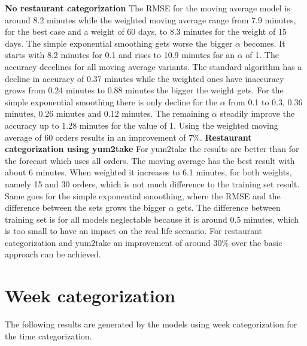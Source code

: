 \newline\newline\textbf{No restaurant categorization}\newline
The RMSE for the moving average model is around 8.2 minutes while the weighted moving average range from 7.9 minutes, for the best case and a weight of 60 days, to 8.3 minutes for the weight of 15 days. The simple exponential smoothing gets worse the bigger $\alpha$ becomes. It starts with 8.2 minutes for 0.1 and rises to 10.9 minutes for an $\alpha$ of 1. The accuracy decelines for all moving average variants. The standard algorithm has a decline in accuracy of 0.37 minutes while the weighted ones have inaccuracy grows from 0.24 minutes to 0.88 minutes the bigger the weight gets. For the simple exponential smoothing there is only decline for the $\alpha$ from 0.1 to 0.3, 0.36 minutes, 0.26 minutes and 0.12 minutes. The remaining $\alpha$ steadily improve the accuracy up to 1.28 minutes for the value of 1.\newline
Using the weighted moving average of 60 orders results in an improvement of 7\%.
\newline\newline\textbf{Restaurant categorization using yum2take}\newline
For yum2take the results are better than for the forecast which uses all orders. The moving average has the best result with about 6 minutes. When weighted it increases to 6.1 minutes, for both weights, namely 15 and 30 orders, which is not much difference to the training set result. Same goes for the simple exponential smoothing, where the RMSE and the difference between the sets grows the bigger $\alpha$ gets. The difference between training set is for all models neglectable because it is around 0.5 minutes, which is too small to have an impact on the real life scenario.\newline
For restaurant categorization and yum2take an improvement of around 30\% over the basic approach can be achieved.
\section{Week categorization}\label{section:Week categorization}
The following results are generated by the models using week categorization for the time categorization.
